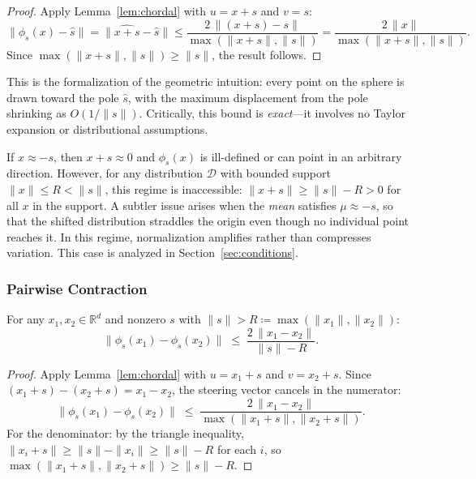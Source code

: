 \begin{proof}
Apply Lemma~\ref{lem:chordal} with $u = x + s$ and $v = s$:
%
\begin{equation}
  \|\phi_s(x) - \hat{s}\|
  = \|\widehat{x + s} - \hat{s}\|
  \leq \frac{2\,\|(x + s) - s\|}{\max(\|x + s\|, \|s\|)}
  = \frac{2\,\|x\|}{\max(\|x + s\|, \|s\|)}.
\end{equation}
%
Since $\max(\|x + s\|, \|s\|) \geq \|s\|$, the result follows.
\end{proof}

\noindent
This is the formalization of the geometric intuition: every point on the sphere
is drawn toward the pole $\hat{s}$, with the maximum displacement from the pole
shrinking as $O(1/\|s\|)$.
Critically, this bound is \emph{exact}---it involves no Taylor expansion or
distributional assumptions.

\begin{remark}
\label{rem:anti-pole}
If $x \approx -s$, then $x + s \approx 0$ and $\phi_s(x)$ is ill-defined or
can point in an arbitrary direction.
However, for any distribution $\mathcal{D}$ with bounded support
$\|x\| \leq R < \|s\|$, this regime is inaccessible:
$\|x + s\| \geq \|s\| - R > 0$ for all $x$ in the support.
A subtler issue arises when the \emph{mean} satisfies $\mu \approx -s$,
so that the shifted distribution straddles the origin even though no
individual point reaches it.
In this regime, normalization amplifies rather than compresses variation.
This case is analyzed in Section~\ref{sec:conditions}.
\end{remark}

\subsubsection{Pairwise Contraction}

\begin{proposition}
\label{prop:pairwise}
For any $x_1, x_2 \in \mathbb{R}^d$ and nonzero $s$ with
$\|s\| > R \coloneqq \max(\|x_1\|, \|x_2\|)$:
%
\begin{equation}
  \|\phi_s(x_1) - \phi_s(x_2)\|
  \;\leq\;
  \frac{2\,\|x_1 - x_2\|}{\|s\| - R}.
  \label{eq:pairwise}
\end{equation}
\end{proposition}

\begin{proof}
Apply Lemma~\ref{lem:chordal} with $u = x_1 + s$ and $v = x_2 + s$.
Since $(x_1 + s) - (x_2 + s) = x_1 - x_2$, the steering vector cancels
in the numerator:
%
\begin{equation}
  \|\phi_s(x_1) - \phi_s(x_2)\|
  \;\leq\;
  \frac{2\,\|x_1 - x_2\|}{\max(\|x_1 + s\|, \|x_2 + s\|)}.
\end{equation}
%
For the denominator: by the triangle inequality,
$\|x_i + s\| \geq \|s\| - \|x_i\| \geq \|s\| - R$ for each $i$,
so $\max(\|x_1 + s\|, \|x_2 + s\|) \geq \|s\| - R$.
\end{proof}

